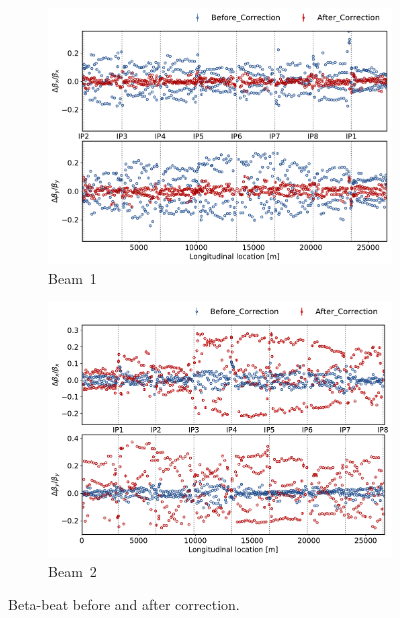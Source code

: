 \documentclass[a4paper]{cernatsnote}
\begin{document}
\begin{figure}[ht]
\begin{subfigure}{.5\textwidth}
  \centering
  \includegraphics[width=.8\linewidth]{plots/beam1/beta_beat_before_and_after_corr.pdf}  
  \caption{Beam~1}
\end{subfigure}
\begin{subfigure}{.5\textwidth}
  \centering
  \includegraphics[width=.8\linewidth]{plots/beam2/beta_beat_before_after_correction.pdf}  
  \caption{Beam~2}
\end{subfigure}
\caption{Beta-beat before and after correction.}
\label{fig:before_after_correction_beta_beat}
\end{figure}
\end{document}
